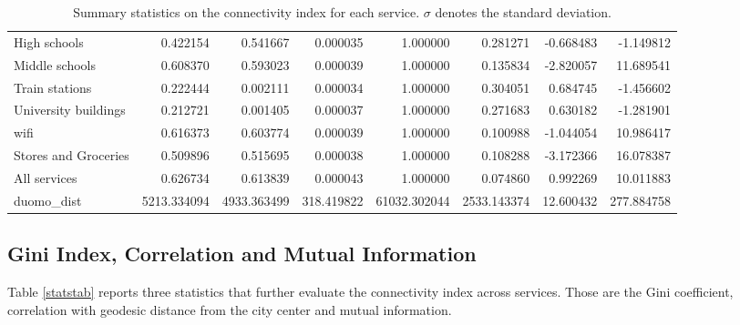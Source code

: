 \documentclass[12pt]{article}
\begin{document}
\begin{landscape}
\begin{table}
\begin{tabular}{lrrrrrrr}
					 High schools &    0.422154 &    0.541667 &   0.000035 &     1.000000 &    0.281271 & -0.668483 &  -1.149812 \\
				   Middle schools &    0.608370 &    0.593023 &   0.000039 &     1.000000 &    0.135834 & -2.820057 &  11.689541 \\
				   Train stations &    0.222444 &    0.002111 &   0.000034 &     1.000000 &    0.304051 &  0.684745 &  -1.456602 \\
			 University buildings &    0.212721 &    0.001405 &   0.000037 &     1.000000 &    0.271683 &  0.630182 &  -1.281901 \\
							 wifi &    0.616373 &    0.603774 &   0.000039 &     1.000000 &    0.100988 & -1.044054 &  10.986417 \\
			 Stores and Groceries &    0.509896 &    0.515695 &   0.000038 &     1.000000 &    0.108288 & -3.172366 &  16.078387 \\
					 All services &    0.626734 &    0.613839 &   0.000043 &     1.000000 &    0.074860 &  0.992269 &  10.011883 \\
					   duomo\_dist & 5213.334094 & 4933.363499 & 318.419822 & 61032.302044 & 2533.143374 & 12.600432 & 277.884758 \\
			\bottomrule
			\end{tabular}
			
			\caption{Summary statistics on the connectivity index for each service. $\sigma$ denotes the standard deviation.}
			\label{suumstatstab}

		\end{table}	
		\end{landscape}

\subsection{Gini Index, Correlation and Mutual Information}

Table \ref{statstab} reports three statistics that further evaluate the connectivity index across services. Those are the Gini coefficient, correlation with geodesic distance from the city center and mutual information. 
\end{document}
